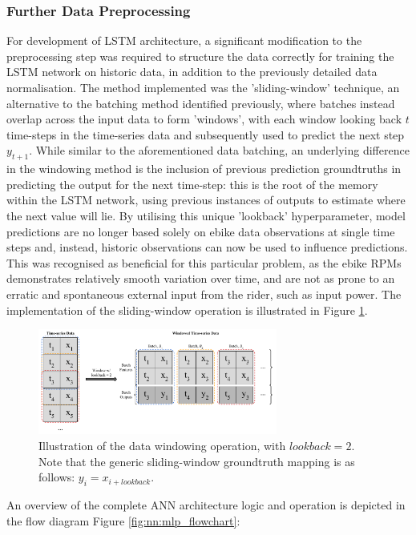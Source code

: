\documentclass[a4paper, 10pt]{article}
\numberwithin{equation}{section}
\begin{document}
\subsubsection{Further Data Preprocessing}
For development of LSTM architecture, a significant modification to the preprocessing step was required to structure the data correctly for training the LSTM network on historic data, in addition to the previously detailed data normalisation. The method implemented was the 'sliding-window' technique, an alternative to the batching method identified previously, where batches instead overlap across the input data to form 'windows', with each window looking back $t$ time-steps in the time-series data and subsequently used to predict the next step $y_{t+1}$. While similar to the aforementioned data batching, an underlying difference in the windowing method is the inclusion of previous prediction groundtruths in predicting the output for the next time-step: this is the root of the memory within the LSTM network, using previous instances of outputs to estimate where the next value will lie. By utilising this unique 'lookback' hyperparameter, model predictions are no longer based solely on ebike data observations at single time steps and, instead, historic observations can now be used to influence predictions. This was recognised as beneficial for this particular problem, as the ebike RPMs demonstrates relatively smooth variation over time, and are not as prone to an erratic and spontaneous external input from the rider, such as input power. The implementation of the sliding-window operation is illustrated in Figure \ref{fig:nn:windowing}.

\begin{figure}[h!]
    \centering
    \includegraphics[width=0.7\textwidth]{images/NN_Generic/windowed_data.pdf}
    \caption{Illustration of the data windowing operation, with $lookback = 2$. Note that the generic sliding-window groundtruth mapping is as follows: $y_{i} = x_{i+lookback}$.}
    \label{fig:nn:windowing}
\end{figure} 

An overview of the complete ANN architecture logic and operation is depicted in the flow diagram Figure \ref{fig:nn:mlp_flowchart}:
\end{document}
